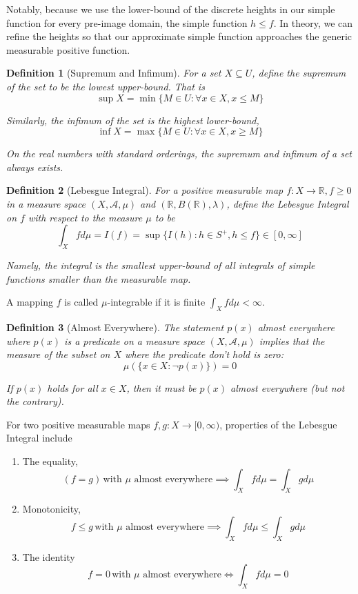 \documentclass{article}
\newtheorem{defi}{Definition}[section]
\begin{document}
Notably, because we use the lower-bound of the discrete heights in our simple function for every pre-image domain, the simple function $h \leq f$. In theory, we can refine the heights so that our approximate simple function approaches the generic measurable positive function.

\begin{defi}[Supremum and Infimum]
    For a set $X \subseteq U$, define the supremum of the set to be the lowest upper-bound. That is
    \[
    \sup X = \min \{M \in U \colon \forall x \in X, x \leq M\}
    \]

    Similarly, the infimum of the set is the highest lower-bound,
    \[
    \inf X = \max \{M \in U \colon \forall x \in X, x \geq M\}
    \]

    On the real numbers with standard orderings, the supremum and infimum of a set always exists.
\end{defi}

\begin{defi}[Lebesgue Integral]
    For a positive measurable map $f \colon X \to \mathbb{R}, f \geq 0$ in a measure space $(X, \mathcal A, \mu)$ and $(\mathbb{R}, B(\mathbb{R}), \lambda)$, define the Lebesgue Integral on $f$ with respect to the measure $\mu$ to be
    \[
        \int_X f d\mu = I(f) = \sup \{ I(h) \colon h \in S^+, h \leq f\} \in [0, \infty]
    \]

    Namely, the integral is the smallest upper-bound of all integrals of simple functions smaller than the measurable map.
\end{defi}

A mapping $f$ is called $\mu$-integrable if it is finite $\int_X f d\mu < \infty$.

\begin{defi}[Almost Everywhere]
    The statement $p(x)$ almost everywhere where $p(x)$ is a predicate on a measure space $(X, \mathcal A, \mu)$ implies that the measure of the subset on $X$ where the predicate don't hold is zero:
    \[
        \mu(\{x \in X \colon \lnot p(x)\}) = 0
    \]

    If $p(x)$ holds for all $x \in X$, then it must be $p(x)$ almost everywhere (but not the contrary).
\end{defi}

For two positive measurable maps $f, g \colon X \to [0, \infty)$, properties of the Lebesgue Integral include
\begin{enumerate}
    \item The equality,
    \[
    (f = g)\, \text{with $\mu$ almost everywhere} \implies \int_X f d\mu = \int_X g d\mu
    \]

    \item Monotonicity,
    \[
        f \leq g \, \text{with $\mu$ almost everywhere} \implies \int_X f d\mu \leq \int_X g d\mu
    \]

    \item The identity
    \[
        f = 0 \, \text{with $\mu$ almost everywhere} \iff \int_X f d\mu = 0
    \]
\end{enumerate}
\end{document}

